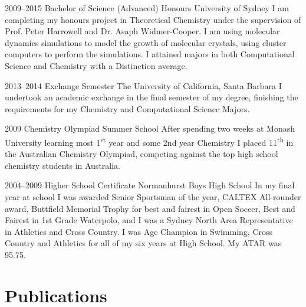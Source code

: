 \documentclass{friggeri-cv} %
\begin{document}
\begin{entrylist}


\entry
{2009--2015}
{Bachelor of Science (Advanced) Honours}
{University of Sydney}
{I am completing my honours project in Theoretical Chemistry under the supervision of Prof. Peter Harrowell and Dr. Asaph Widmer-Cooper. I am using molecular dynamics simulations to model the growth of molecular crystals, using cluster computers to perform the simulations. I attained majors in both Computational Science and Chemistry with a Distinction average.
}


\entry
{2013--2014}
{Exchange Semester}
{The University of California, Santa Barbara}
{I undertook an academic exchange in the final semester of my degree, finishing the requirements for my Chemistry and Computational Science Majors.}


\entry
{2009}
{Chemistry Olympiad Summer School}
{}
{After spending two weeks at Monash University learning most 1\textsuperscript{st} year and some 2nd year Chemistry I placed 11\textsuperscript{th} in the Australian Chemistry Olympiad, competing against the top high school chemistry students in Australia.}

\entry
{2004--2009}
{Higher School Certificate}
{Normanhurst Boys High School}
{In my final year at school I was awarded Senior Sportsman of the year, CALTEX All-rounder award, Buttfield Memorial Trophy for best and fairest in Open Soccer, Best and Fairest in 1st Grade Waterpolo, and I was a Sydney North Area Representative in Athletics and Cross Country. I was Age Champion in Swimming, Cross Country and Athletics for all of my six years at High School. My ATAR was 95.75.
}


\end{entrylist}



\section{Publications}

\end{document}
